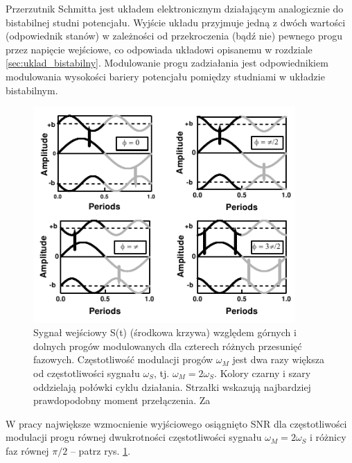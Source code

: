   Przerzutnik Schmitta jest układem elektronicznym działającym analogicznie do bistabilnej studni potencjału. Wyjście układu przyjmuje jedną z dwóch wartości (odpowiednik stanów) w zależności od przekroczenia (bądź nie) pewnego progu przez napięcie wejściowe, co odpowiada układowi opisanemu w rozdziale \ref{sec:uklad_bistabilny}. Modulowanie progu zadziałania jest odpowiednikiem modulowania wysokości bariery potencjału pomiędzy studniami w układzie bistabilnym.


  \begin{figure}
    \includegraphics[width=100mm]{images/gammaitoni_2.png}
    \caption{Sygnał wejściowy S(t) (środkowa krzywa) względem górnych i dolnych progów modulowanych dla czterech różnych przesunięć fazowych. Częstotliwość modulacji progów $\omega_M$ jest dwa razy większa od częstotliwości sygnału $\omega_S$, tj. $\omega_M = 2 \omega_S$. Kolory czarny i szary oddzielają połówki cyklu działania. Strzałki wskazują najbardziej prawdopodobny moment przełączenia. Za \cite{gammaitoni}}
    \label{fig:graphics:gammaitoni:fig2}
  \end{figure}

  W pracy \cite{gammaitoni} największe wzmocnienie wyjściowego osiągnięto SNR dla częstotliwości modulacji progu równej dwukrotności częstotliwości sygnału $\omega_M = 2 \omega_S$ i różnicy faz równej $\pi/2$ -- patrz rys. \ref{fig:graphics:gammaitoni:fig2}.

